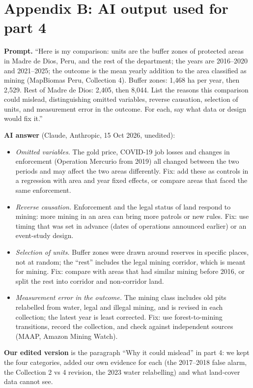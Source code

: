 \documentclass[10pt,a4paper]{article}
\begin{document}
\section*{Appendix B: AI output used for part 4}
{\small
\textbf{Prompt.} ``Here is my comparison: units are the buffer zones of protected areas in Madre de Dios, Peru, and the rest of the department; the years are 2016--2020 and 2021--2025; the outcome is the mean yearly addition to the area classified as mining (MapBiomas Peru, Collection 4). Buffer zones: 1,468 ha per year, then 2,529. Rest of Madre de Dios: 2,405, then 8,044. List the reasons this comparison could mislead, distinguishing omitted variables, reverse causation, selection of units, and measurement error in the outcome. For each, say what data or design would fix it.''

\textbf{AI answer} (Claude, Anthropic, 15 Oct 2026, unedited):
\begin{itemize}
\item \emph{Omitted variables.} The gold price, COVID-19 job losses and changes in enforcement (Operation Mercurio from 2019) all changed between the two periods and may affect the two areas differently. Fix: add these as controls in a regression with area and year fixed effects, or compare areas that faced the same enforcement.
\item \emph{Reverse causation.} Enforcement and the legal status of land respond to mining: more mining in an area can bring more patrols or new rules. Fix: use timing that was set in advance (dates of operations announced earlier) or an event-study design.
\item \emph{Selection of units.} Buffer zones were drawn around reserves in specific places, not at random; the ``rest'' includes the legal mining corridor, which is meant for mining. Fix: compare with areas that had similar mining before 2016, or split the rest into corridor and non-corridor land.
\item \emph{Measurement error in the outcome.} The mining class includes old pits relabelled from water, legal and illegal mining, and is revised in each collection; the latest year is least corrected. Fix: use forest-to-mining transitions, record the collection, and check against independent sources (MAAP, Amazon Mining Watch).
\end{itemize}
\textbf{Our edited version} is the paragraph ``Why it could mislead'' in part 4: we kept the four categories, added our own evidence for each (the 2017--2018 false alarm, the Collection 2 vs 4 revision, the 2023 water relabelling) and what land-cover data cannot see.}
\end{document}
